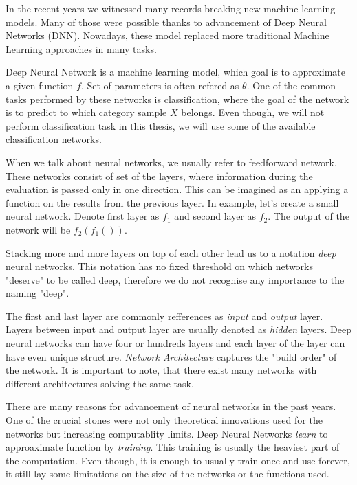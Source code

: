 In the recent years we witnessed many records-breaking new machine learning models. Many of those were possible thanks to advancement of Deep Neural Networks (DNN). Nowadays, these model replaced more traditional Machine Learning approaches in many tasks.

Deep Neural Network is a machine learning model, which goal is to approximate a given function \(f\). Set of parameters is often refered as \(\theta\). One of the common tasks performed by these networks is classification, where the goal of the network is to predict to which category sample \(X\) belongs. Even though, we will not perform classification task in this thesis, we will use some of the available classification networks.

When we talk about neural networks, we usually refer to feedforward network. These networks consist of set of the layers, where information during the evaluation is passed only in one direction. This can be imagined as an applying a function on the results from the previous layer. In example, let's create a small neural network. Denote first layer as \(f_1\) and second layer as \(f_2\). The output of the network will be \(f_2\left(f_1\left(\right)\right)\).

Stacking more and more layers on top of each other lead us to a notation \emph{deep} neural networks. This notation has no fixed threshold on which networks "deserve" to be called deep, therefore we do not recognise any importance to the naming "deep". 

The first and last layer are commonly refferences as \emph{input} and \emph{output} layer. Layers between input and output layer are usually denoted as \emph{hidden} layers. Deep neural networks can have four or hundreds layers and each layer of the layer can have even unique structure. \emph{Network Architecture} captures the "build order" of the network. It is important to note, that there exist many networks with different architectures solving the same task.

There are many reasons for advancement of neural networks in the past years. One of the crucial stones were not only theoretical innovations used for the networks but increasing computablity limits. Deep Neural Networks \emph{learn} to approaximate function by \emph{training}. This training is usually the heaviest part of the computation. Even though, it is enough to usually train once and use forever, it still lay some limitations on the size of the networks or the functions used.

